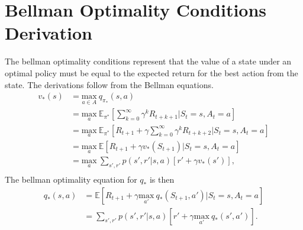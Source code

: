 \documentclass{article}
\begin{document}
\section{Bellman Optimality Conditions Derivation}\label{bellman}
The bellman optimality conditions represent that the value of a state under an optimal policy must be equal to the expected return for the best action from the state. The derivations follow from the Bellman equations.
\begin{equation*}
\begin{split}
v_*(s) &= \underset{a \in A}{\text{max}} \ q_{\pi_*}(s,a) \\
&= \underset{a}{\text{max}} \ \mathbb{E}_{\pi^*}[\sum_{k=0}^\infty \gamma^k R_{t + k+ 1}|S_t = s, A_t =a] \\
&= \underset{a}{\text{max}} \ \mathbb{E}_{\pi^*}[R_{t+1} + \gamma \sum_{k=0}^\infty \gamma^k R_{t + k+ 2}|S_t = s, A_t =a] \\
&= \underset{a}{\text{max}} \ \mathbb{E}[R_{t+1} + \gamma v_*(S_{t+1})|S_t = s, A_t =a] \\
&= \underset{a}{\text{max}} \ \sum_{s', r'}p(s', r'|s,a)[r' + \gamma v_*(s')], \\
\end{split}
\end{equation*}
The bellman optimality equation for $q_*$ is then 
\begin{equation*}
\begin{split}
q_*(s,a) &= \mathbb{E}[R_{t+1} + \gamma \underset{a'}{\text{max}} \ q_*(S_{t+1}, a')|S_t =s, A_t=a] \\
&= \sum_{s', r'}p(s', r'|s,a)[r' + \gamma \underset{a'}{\text{max}} \ q_*(s',a')].
\end{split}
\end{equation*}
\end{document}
